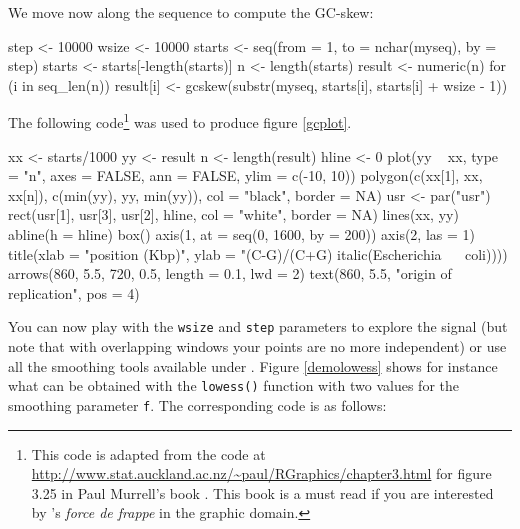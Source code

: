 \documentclass{article}
\begin{document}
We move now along the sequence to compute the GC-skew:

\begin{Schunk}
\begin{Sinput}
 step <- 10000
 wsize <- 10000
 starts <- seq(from = 1, to = nchar(myseq), by = step)
 starts <- starts[-length(starts)]
 n <- length(starts)
 result <- numeric(n)
 for (i in seq_len(n)) {
     result[i] <- gcskew(substr(myseq, starts[i], starts[i] + 
         wsize - 1))
 }
\end{Sinput}
\end{Schunk}

The following code\footnote{
This code is adapted from the code at \url{http://www.stat.auckland.ac.nz/~paul/RGraphics/chapter3.html} for
figure 3.25 in Paul Murrell's book \cite{MurrellP2005}. This book is a must read if you are interested
by \Rlogo{}'s \textit{force de frappe} in the graphic domain. 
} was used to produce figure \ref{gcplot}.

\begin{Schunk}
\begin{Sinput}
 xx <- starts/1000
 yy <- result
 n <- length(result)
 hline <- 0
 plot(yy ~ xx, type = "n", axes = FALSE, ann = FALSE, ylim = c(-10, 
     10))
 polygon(c(xx[1], xx, xx[n]), c(min(yy), yy, min(yy)), col = "black", 
     border = NA)
 usr <- par("usr")
 rect(usr[1], usr[3], usr[2], hline, col = "white", border = NA)
 lines(xx, yy)
 abline(h = hline)
 box()
 axis(1, at = seq(0, 1600, by = 200))
 axis(2, las = 1)
 title(xlab = "position (Kbp)", ylab = "(C-G)/(C+G) %
     italic(Escherichia ~ ~coli))))
 arrows(860, 5.5, 720, 0.5, length = 0.1, lwd = 2)
 text(860, 5.5, "origin of replication", pos = 4)
\end{Sinput}
\end{Schunk}

\begin{figure}
\centering{}
\end{figure}

You can now play with the \texttt{wsize} and \texttt{step} parameters
to explore the signal (but note that with overlapping windows your
points are no more independent) or use all the smoothing tools
available under \Rlogo{}. Figure \ref{demolowess} shows for instance 
what can be obtained with the \texttt{lowess()} function with two
values for the smoothing parameter \texttt{f}. The corresponding code
is as follows:
\end{document}
